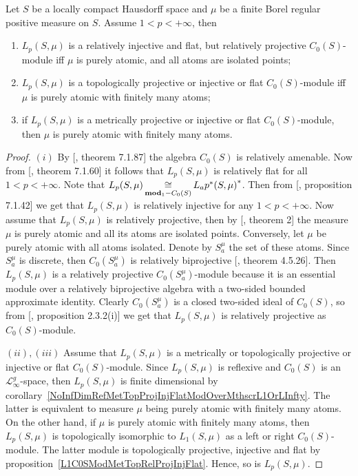 \begin{proposition}\label{LpC0SModMetTopRelProjIngFlat} Let $S$ be a locally
compact Hausdorff space and $\mu$ be a finite Borel regular positive measure on
$S$. Assume $1<p<+\infty$, then 

\begin{enumerate}[label = (\roman*)]
    \item $L_p(S,\mu)$ is a relatively injective and flat, but relatively 
    projective $C_0(S)$-module iff $\mu$ is purely atomic, and all atoms 
    are isolated points;

    \item $L_p(S,\mu)$ is a topologically projective or injective or flat 
    $C_0(S)$-module iff $\mu$ is purely atomic with finitely many atoms;

    \item if $L_p(S,\mu)$ is a metrically projective or injective or flat 
    $C_0(S)$-module, then $\mu$ is purely atomic with finitely many atoms.
\end{enumerate}
\end{proposition}
\begin{proof} $(i)$ By [\cite{HelBanLocConvAlg}, theorem 7.1.87] the algebra
$C_0(S)$ is relatively amenable. Now from [\cite{HelBanLocConvAlg}, theorem
7.1.60] it follows that $L_p(S,\mu)$ is relatively flat for all $1<p<+\infty$.
Note that $L_p(S,\mu)\mathop{\mathbin{\cong}}\limits_{\mathbf{mod}_1-C_0(S)}{L_ a{p^*}(S,\mu)}^*$. Then from
[\cite{HelBanLocConvAlg}, proposition 7.1.42] we get that $L_p(S,\mu)$ is
relatively injective for any $1<p<+\infty$. Now assume that $L_p(S,\mu)$ is
relatively projective, then by [\cite{NemRelProjModLp}, theorem 2]
the measure $\mu$ is purely atomic and all its atoms are isolated points.
Conversely, let $\mu$ be purely atomic with all atoms isolated. Denote by
$S_a^{\mu}$ the set of these atoms. Since $S_a^{\mu}$ is discrete, then
$C_0(S_a^{\mu})$ is relatively biprojective [\cite{HelHomolBanTopAlg}, theorem
4.5.26]. Then $L_p(S,\mu)$ is a relatively projective $C_0(S_a^{\mu})$-module
because it is an essential module over a relatively biprojective algebra with
a two-sided bounded approximate identity. Clearly $C_0(S_a^{\mu})$ is a closed 
two-sided ideal of $C_0(S)$, so 
from [\cite{RamsHomPropSemgroupAlg}, proposition 2.3.2(i)]
we get that $L_p(S,\mu)$ is relatively projective as $C_0(S)$-module.

$(ii), (iii)$ Assume that $L_p(S,\mu)$ is a metrically or topologically projective
or injective or flat $C_0(S)$-module. Since $L_p(S,\mu)$ is reflexive and
$C_0(S)$ is an $\mathscr{L}_\infty^g$-space, then $L_p(S,\mu)$ is finite
dimensional by
corollary~\ref{NoInfDimRefMetTopProjInjFlatModOverMthscrL1OrLInfty}. The latter
is equivalent to measure $\mu$ being purely atomic with finitely many atoms. On
the other hand, if $\mu$ is purely atomic with finitely many atoms, then
$L_p(S,\mu)$ is topologically isomorphic to $L_1(S,\mu)$ as a left or right
$C_0(S)$-module. The latter module is topologically projective, injective and
flat by proposition~\ref{L1C0SModMetTopRelProjInjFlat}. Hence, so is $L_p(S,\mu)$.
\end{proof}

